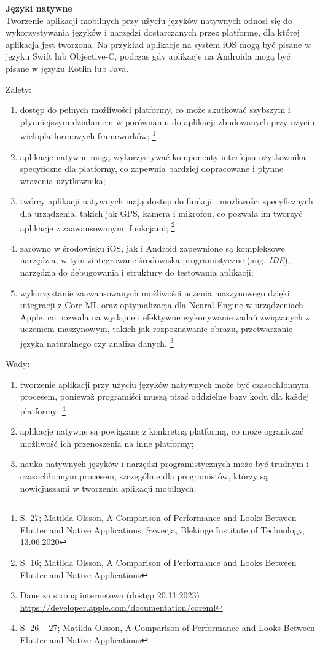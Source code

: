 \documentclass[12pt, a4paper, twoside, openany]{book}
\begin{document}
\textbf{Języki natywne\\}
\indent Tworzenie aplikacji mobilnych przy użyciu języków natywnych odnosi się do wykorzystywania języków i narzędzi dostarczanych przez platformę, dla której aplikacja jest tworzona. Na przykład aplikacje na system iOS mogą być pisane w języku Swift lub Objective-C, podczas gdy aplikacje na Androida mogą być pisane w języku Kotlin lub Java.

Zalety:
\begin{enumerate}[label=--]
    \item dostęp do pełnych możliwości platformy, co może skutkować szybszym i płynniejszym działaniem w porównaniu do aplikacji zbudowanych przy użyciu wieloplatformowych frameworków; \footnote{S. 27; Matilda Olsson, A Comparison of Performance and Looks Between Flutter and Native Applications, Szwecja, Blekinge Institute of Technology, 13.06.2020}
    \item aplikacje natywne mogą wykorzystywać komponenty interfejsu użytkownika specyficzne dla platformy, co zapewnia bardziej dopracowane i płynne wrażenia użytkownika;
    \item twórcy aplikacji natywnych mają dostęp do funkcji i możliwości specyficznych dla urządzenia, takich jak GPS, kamera i mikrofon, co pozwala im tworzyć aplikacje z zaawansowanymi funkcjami; \footnote{S. 16; Matilda Olsson, A Comparison of Performance and Looks Between Flutter and Native Applications}
    \item zarówno w środowisku iOS, jak i Android zapewnione są kompleksowe narzędzia, w tym zintegrowane środowiska programistyczne (ang. \textit{IDE}), narzędzia do debugowania i struktury do testowania aplikacji;
    \item wykorzystanie zaawansowanych możliwości uczenia maszynowego dzięki integracji z Core ML oraz optymalizacja dla Neural Engine w urządzeniach Apple, co pozwala na wydajne i efektywne wykonywanie zadań związanych z uczeniem maszynowym, takich jak rozpoznawanie obrazu, przetwarzanie języka naturalnego czy analiza danych. \footnote{ Dane za stroną internetową (dostęp 20.11.2023) \url{https://developer.apple.com/documentation/coreml} }
\end{enumerate}

Wady:
\begin{enumerate}[label=--]
    \item tworzenie aplikacji przy użyciu języków natywnych może być czasochłonnym procesem, ponieważ programiści muszą pisać oddzielne bazy kodu dla każdej platformy; \footnote{S. 26 -- 27; Matilda Olsson, A Comparison of Performance and Looks Between Flutter and Native Applications}
    \item aplikacje natywne są powiązane z konkretną platformą, co może ograniczać możliwość ich przenoszenia na inne platformy;
    \item nauka natywnych języków i narzędzi programistycznych może być trudnym i czasochłonnym procesem, szczególnie dla programistów, którzy są nowicjuszami w tworzeniu aplikacji mobilnych.
\end{enumerate}
\end{document}
